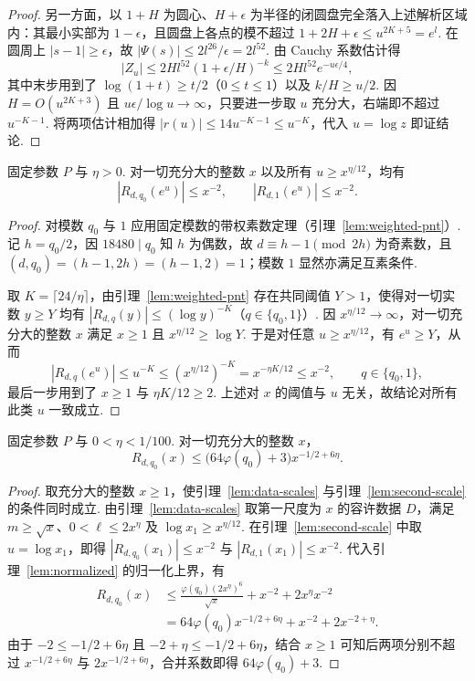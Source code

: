 \begin{proof}
另一方面，以 $1+H$ 为圆心、$H+\epsilon$ 为半径的闭圆盘完全落入上述解析区域内：其最小实部为 $1-\epsilon$，且圆盘上各点的模不超过 $1+2H+\epsilon\le u^{2K+5}=e^l$. 在圆周上 $|s-1|\ge\epsilon$，故 $|\Psi(s)|\le 2l^{26}/\epsilon=2l^{52}$. 由 Cauchy 系数估计得
\[
 |Z_u|\le2Hl^{52}(1+\epsilon/H)^{-k}
        \le2Hl^{52}e^{-u\epsilon/4},
\]
其中末步用到了 $\log(1+t)\ge t/2$（$0\le t\le1$）以及 $k/H\ge u/2$. 因 $H=O(u^{2K+3})$ 且 $u\epsilon/\log u\to\infty$，只要进一步取 $u$ 充分大，右端即不超过 $u^{-K-1}$. 将两项估计相加得 $|r(u)|\le14u^{-K-1}\le u^{-K}$，代入 $u=\log z$ 即证结论.
\end{proof}

\begin{lemma}[大尺度处的余项]
\label{lem:second-scale}
\emitthmsource
固定参数 $P$ 与 $\eta>0$. 对一切充分大的整数 $x$ 以及所有 $u\ge x^{\eta/12}$，均有
\[
 |R_{d,q_0}(e^u)|\le x^{-2},\qquad |R_{d,1}(e^u)|\le x^{-2}.
\]
\end{lemma}
\begin{proof}
对模数 $q_0$ 与 $1$ 应用固定模数的带权素数定理（引理~\ref{lem:weighted-pnt}）. 记 $h=q_0/2$，因 $18480\mid q_0$ 知 $h$ 为偶数，故 $d\equiv h-1\pmod{2h}$ 为奇素数，且 $(d,q_0)=(h-1,2h)=(h-1,2)=1$；模数 $1$ 显然亦满足互素条件.

取 $K=\lceil24/\eta\rceil$，由引理~\ref{lem:weighted-pnt} 存在共同阈值 $Y>1$，使得对一切实数 $y\ge Y$ 均有 $|R_{d,q}(y)|\le(\log y)^{-K}$（$q\in\{q_0,1\}$）. 因 $x^{\eta/12}\to\infty$，对一切充分大的整数 $x$ 满足 $x\ge1$ 且 $x^{\eta/12}\ge\log Y$. 于是对任意 $u\ge x^{\eta/12}$，有 $e^u\ge Y$，从而
\[
 |R_{d,q}(e^u)|\le u^{-K}
 \le (x^{\eta/12})^{-K}=x^{-\eta K/12}\le x^{-2},
 \qquad q\in\{q_0,1\},
\]
最后一步用到了 $x\ge1$ 与 $\eta K/12\ge2$. 上述对 $x$ 的阈值与 $u$ 无关，故结论对所有此类 $u$ 一致成立.
\end{proof}

\begin{lemma}[整数点处的单侧上界]
\label{lem:integer-bound}
\emitthmsource
固定参数 $P$ 与 $0<\eta<1/100$. 对一切充分大的整数 $x$，
\[
 R_{d,q_0}(x)\le \bigl(64\varphi(q_0)+3\bigr)x^{-1/2+6\eta}.
\]
\end{lemma}
\begin{proof}
取充分大的整数 $x\ge1$，使引理~\ref{lem:data-scales} 与引理~\ref{lem:second-scale} 的条件同时成立. 由引理~\ref{lem:data-scales} 取第一尺度为 $x$ 的容许数据 $D$，满足 $m\ge\sqrt{x}$、$0<\ell\le2x^\eta$ 及 $\log x_1\ge x^{\eta/12}$. 在引理~\ref{lem:second-scale} 中取 $u=\log x_1$，即得 $|R_{d,q_0}(x_1)|\le x^{-2}$ 与 $|R_{d,1}(x_1)|\le x^{-2}$. 代入引理~\ref{lem:normalized} 的归一化上界，有
\[
 \begin{aligned}
 R_{d,q_0}(x)
 &\le \frac{\varphi(q_0)(2x^\eta)^6}{\sqrt{x}}
       +x^{-2}+2x^\eta x^{-2}\\
 &=64\varphi(q_0)x^{-1/2+6\eta}+x^{-2}+2x^{-2+\eta}.
 \end{aligned}
\]
由于 $-2\le -1/2+6\eta$ 且 $-2+\eta\le -1/2+6\eta$，结合 $x\ge1$ 可知后两项分别不超过 $x^{-1/2+6\eta}$ 与 $2x^{-1/2+6\eta}$，合并系数即得 $64\varphi(q_0)+3$.
\end{proof}

